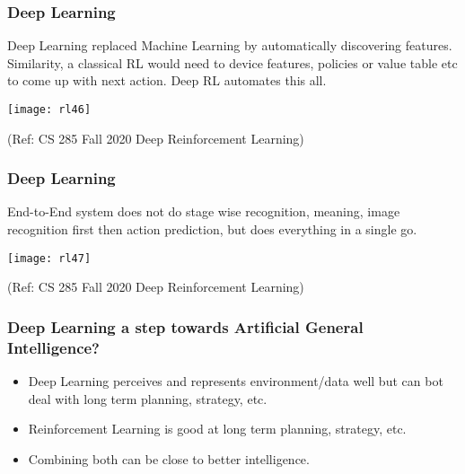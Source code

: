 \begin{frame}[fragile]\frametitle{Deep Learning}

Deep Learning replaced Machine Learning by automatically discovering features. Similarity, a classical RL would need to device features, policies or value table etc to come up with next action. Deep RL automates this all.

\begin{center}
\texttt{[image: rl46]}
\end{center}


{\tiny (Ref: CS 285 Fall 2020 Deep Reinforcement Learning)}

\end{frame}


\begin{frame}[fragile]\frametitle{Deep Learning}

End-to-End system does not do stage wise recognition, meaning, image recognition first then action prediction, but does everything in a single go.

\begin{center}
\texttt{[image: rl47]}
\end{center}


{\tiny (Ref: CS 285 Fall 2020 Deep Reinforcement Learning)}

\end{frame}

\begin{frame}[fragile]\frametitle{Deep Learning a step towards Artificial General Intelligence?}

\begin{itemize}
\item Deep Learning perceives and represents environment/data well but can bot deal with long term planning, strategy, etc.
\item Reinforcement Learning is good at long term planning, strategy, etc.
\item Combining both can be close to better intelligence. 
\end{itemize}

\end{frame}

